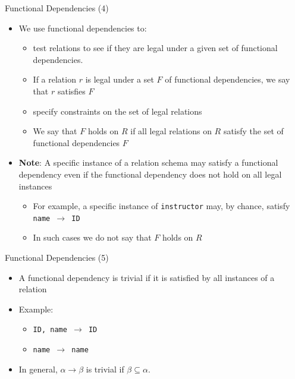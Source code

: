 \documentclass[aspectratio=169, xcolor=dvipsnames]{beamer}
\begin{document}
\begin{frame}{Functional Dependencies (4)}
    \begin{itemize}[<+->]
        \item We use functional dependencies to:
        \begin{itemize}
            \item[$\triangleright$] test relations to see if they are legal under a given set of functional dependencies.
            \item[$\triangleright$] If a relation $r$ is legal under a set $F$ of functional dependencies, we say that $r$ satisfies $F$
            \item[$\triangleright$] specify constraints on the set of legal relations
            \item[$\triangleright$] We say that $F$ holds on $R$ if all legal relations on $R$ satisfy the set of functional dependencies $F$
        \end{itemize}
        \item \textbf{Note}: A specific instance of a relation schema may satisfy a functional dependency even if the functional dependency does not hold on all legal instances
        \begin{itemize}
            \item[$\triangleright$] For example, a specific instance of \texttt{instructor} may, by chance, satisfy \texttt{name $\rightarrow$ ID}
            \item[$\triangleright$] In such cases we do not say that $F$ holds on $R$
        \end{itemize}
    \end{itemize}
\end{frame}

\begin{frame}{Functional Dependencies (5)}
    \begin{itemize}[<+->]
        \item A functional dependency is trivial if it is satisfied by all instances of a relation
        \item Example:
        \begin{itemize}
            \item[$\triangleright$] \texttt{ID, name $\rightarrow$ ID}
            \item[$\triangleright$] \texttt{name $\rightarrow$ name}
        \end{itemize}
        \item In general, $\alpha \rightarrow \beta$ is trivial if $\beta \subseteq \alpha$.
    \end{itemize}
\end{frame}
\end{document}
